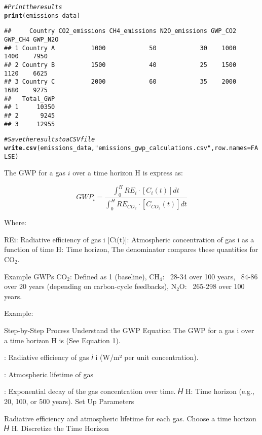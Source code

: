 \documentclass{tufte-handout}\usepackage[]{graphicx}\usepackage[]{xcolor}
\makeatletter
\newcommand{\hlnum}[1]{\textcolor[rgb]{0.686,0.059,0.569}{#1}}%
\newcommand{\hlstr}[1]{\textcolor[rgb]{0.192,0.494,0.8}{#1}}%
\newcommand{\hlcom}[1]{\textcolor[rgb]{0.678,0.584,0.686}{\textit{#1}}}%
\newcommand{\hlstd}[1]{\textcolor[rgb]{0.345,0.345,0.345}{#1}}%
\newcommand{\hlkwc}[1]{\textcolor[rgb]{0.333,0.667,0.333}{#1}}%
\newcommand{\hlkwd}[1]{\textcolor[rgb]{0.737,0.353,0.396}{\textbf{#1}}}%
\newenvironment{kframe}{%
 \def\at@end@of@kframe{}%
 \ifinner\ifhmode%
  \def\at@end@of@kframe{\end{minipage}}%
  \begin{minipage}{\columnwidth}%
 \fi\fi%
 \def\FrameCommand##1{\hskip\@totalleftmargin \hskip-\fboxsep
 \colorbox{shadecolor}{##1}\hskip-\fboxsep
     \hskip-\linewidth \hskip-\@totalleftmargin \hskip\columnwidth}%
 \MakeFramed {\advance\hsize-\width
   \@totalleftmargin\z@ \linewidth\hsize
   \@setminipage}}%
 {\par\unskip\endMakeFramed%
 \at@end@of@kframe}
\newenvironment{knitrout}{}{} %
\makeatother
\begin{document}
\begin{knitrout}
\begin{kframe}
\begin{alltt}
\hlcom{# Print the results}
\hlkwd{print}\hlstd{(emissions_data)}
\end{alltt}
\begin{verbatim}
##     Country CO2_emissions CH4_emissions N2O_emissions GWP_CO2 GWP_CH4 GWP_N2O
## 1 Country A          1000            50            30    1000    1400    7950
## 2 Country B          1500            40            25    1500    1120    6625
## 3 Country C          2000            60            35    2000    1680    9275
##   Total_GWP
## 1     10350
## 2      9245
## 3     12955
\end{verbatim}
\begin{alltt}
\hlcom{# Save the results to a CSV file}
\hlkwd{write.csv}\hlstd{(emissions_data,} \hlstr{"emissions_gwp_calculations.csv"}\hlstd{,} \hlkwc{row.names} \hlstd{=} \hlnum{FALSE}\hlstd{)}
\end{alltt}
\end{kframe}
\end{knitrout}


The GWP for a gas $i$ over a time horizon H is express as: 

\begin{equation}
GWP_i = \frac{\int^{H}_{0}RE_i \cdot [C_i(t)]dt}{\int^{H}_{0}RE_{CO_2} \cdot [C_{CO_2}(t)]dt}
\end{equation}

Where: 

REi: Radiative efficiency of gas i
[Ci(t)]: Atmospheric concentration of gas i as a function of time
H: Time horizon,
The denominator compares these quantities for CO$_2$.


Example GWPs
CO$_2$: Defined as 1 (baseline),
CH$_4$: ~28-34 over 100 years, ~84-86 over 20 years (depending on carbon-cycle feedbacks),
N$_2$O: ~265-298 over 100 years.\


Example: 

Step-by-Step Process
Understand the GWP Equation The GWP for a gas i over a time horizon
H is (See Equation 1).



 : Radiative efficiency of gas 
𝑖
i (W/m² per unit concentration).

 : Atmospheric lifetime of gas 

 : Exponential decay of the gas concentration over time.
𝐻
H: Time horizon (e.g., 20, 100, or 500 years).
Set Up Parameters

Radiative efficiency and atmospheric lifetime for each gas.
Choose a time horizon 
𝐻
H.
Discretize the Time Horizon
\end{document}
